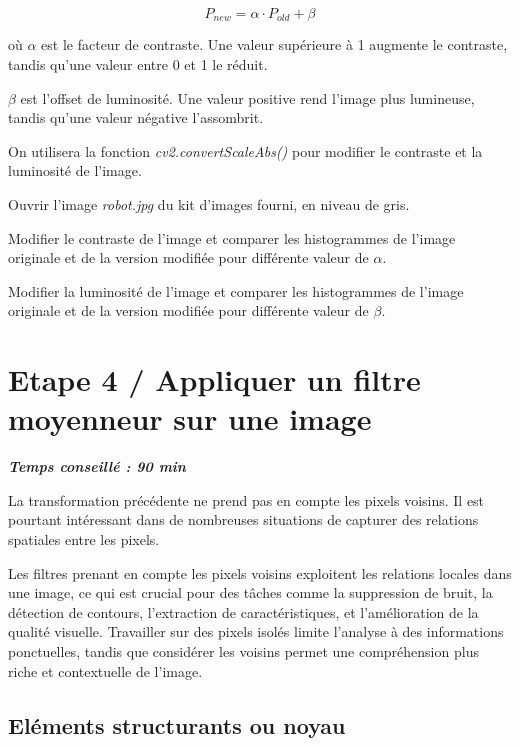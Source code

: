 \documentclass[a4paper,11pt,titlepage]{article} %
\begin{document}
$$P_{new} = \alpha \cdot P_{old} + \beta$$

où $\alpha$ est le facteur de contraste. Une valeur supérieure à 1 augmente le contraste, tandis qu'une valeur entre 0 et 1 le réduit.

$\beta$ est l'offset de luminosité. Une valeur positive rend l'image plus lumineuse, tandis qu'une valeur négative l'assombrit.

\medskip

On utilisera la fonction \textsl{cv2.convertScaleAbs()} pour modifier le contraste et la luminosité de l'image.

\bigskip

\Manip Ouvrir l'image \textsl{robot.jpg} du kit d'images fourni, en niveau de gris.

\Manip Modifier le contraste de l'image et comparer les histogrammes de l'image originale et de la version modifiée pour différente valeur de $\alpha$.

\Manip Modifier la luminosité de l'image et comparer les histogrammes de l'image originale et de la version modifiée pour différente valeur de $\beta$.


\section{Etape 4 / Appliquer un filtre moyenneur sur une image}

\begin{center} \textbf{\textit{Temps conseillé : 90 min}} \end{center}

La transformation précédente ne prend pas en compte les pixels voisins. Il est pourtant intéressant dans de nombreuses situations de capturer des relations spatiales entre les pixels.

Les filtres prenant en compte les pixels voisins exploitent les relations locales dans une image, ce qui est crucial pour des tâches comme la suppression de bruit, la détection de contours, l'extraction de caractéristiques, et l'amélioration de la qualité visuelle. Travailler sur des pixels isolés limite l'analyse à des informations ponctuelles, tandis que considérer les voisins permet une compréhension plus riche et contextuelle de l'image.

\subsection{Eléments structurants ou noyau}
\end{document}
